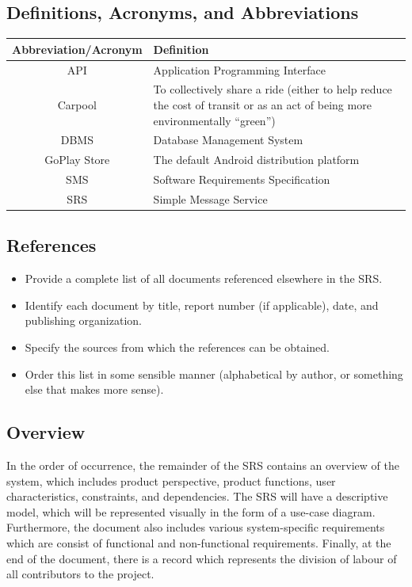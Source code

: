 \documentclass[]{article}
\begin{document}
\subsection{Definitions, Acronyms, and Abbreviations}
\label{sub:definitions_acronyms_and_abbreviations}
\begin{center} \begin{tabular} {|c|p{35em}|}
	\hline
	\textbf{Abbreviation/Acronym} & \textbf{Definition} \\
	\hline \hline
	API & Application Programming Interface \\
	\hline
	Carpool & To collectively share a ride (either to help reduce the cost of transit or as an act of being more environmentally “green”) \\
	\hline
	DBMS & Database Management System \\
	\hline
	GoPlay Store & The default Android distribution platform \\
	\hline
	SMS & Software Requirements Specification \\
	\hline
	SRS & Simple Message Service \\
	\hline
\end{tabular} \end{center}

\subsection{References}
\label{sub:references}
\begin{itemize}
	\item Provide a complete list of all documents referenced elsewhere in the SRS.
	\item Identify each document by title, report number (if applicable), date, and publishing organization.
	\item Specify the sources from which the references can be obtained.
	\item Order this list in some sensible manner (alphabetical by author, or something else that makes more sense).
\end{itemize}

\subsection{Overview}
\label{sub:overview}
In the order of occurrence, the remainder of the SRS contains an overview of the system, which includes product perspective, product functions, user characteristics, constraints, and dependencies. The SRS will have a descriptive model, which will be represented visually in the form of a use-case diagram. Furthermore, the document also includes various system-specific requirements which are consist of functional and non-functional requirements.  Finally, at the end of the document, there is a record which represents the division of labour of all contributors to the project.
\end{document}
